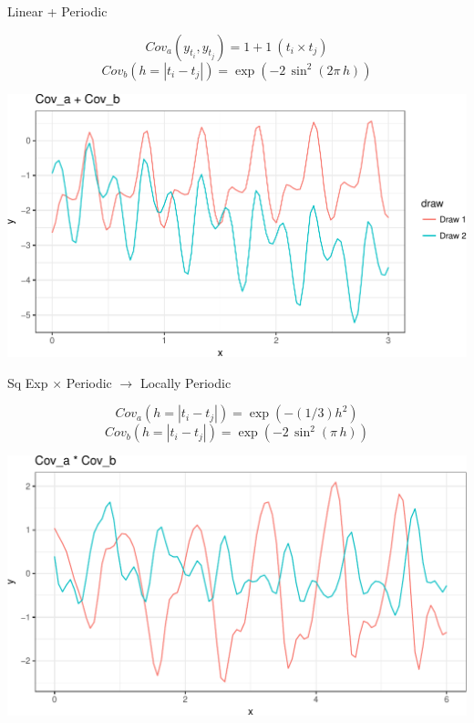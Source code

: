 \documentclass[11pt,ignorenonframetext,]{beamer}
\begin{document}
\begin{frame}[t]{%
\protect\hypertarget{linear-periodic}{%
Linear + Periodic}}

\vspace{-5mm}

\[ Cov_a(y_{t_i}, y_{t_j}) = 1 + 1~(t_i \times t_j) \]
\[ Cov_b(h = |t_i - t_j|) = \exp\left(-2\, \sin^2\left(2\pi\,h\right)\right) \]

\begin{center}\includegraphics[width=\textwidth]{Lec14_files/figure-beamer/unnamed-chunk-10-1} \end{center}

\end{frame}

\begin{frame}[t]{%
\protect\hypertarget{sq-exp-times-periodic-to-locally-periodic}{%
Sq Exp \(\times\) Periodic \(\to\) Locally Periodic}}

\vspace{-5mm}

\[ Cov_a(h = |t_i - t_j|) =\exp(-(1/3)h^2) \]
\[ Cov_b(h = |t_i - t_j|) = \exp\left(-2\, \sin^2\left(\pi\,h\right)\right) \]

\begin{center}\includegraphics[width=\textwidth]{Lec14_files/figure-beamer/unnamed-chunk-11-1} \end{center}

\end{frame}
\end{document}
